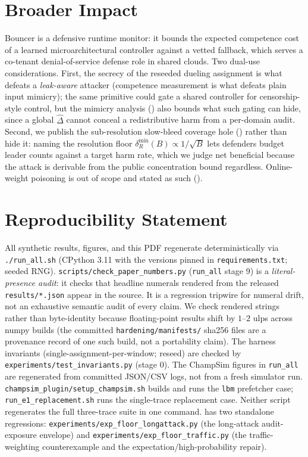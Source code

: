 \documentclass{article}
\newcommand{\dhat}{\hat{\Delta}}
\begin{document}
\section*{Broader Impact}
Bouncer is a defensive runtime monitor: it bounds the expected competence cost of a learned
microarchitectural controller against a vetted fallback, which serves a co-tenant denial-of-service
defense role in shared clouds. Two dual-use considerations. First, the secrecy of the reseeded
dueling assignment is what defeats a \emph{leak-aware} attacker (competence measurement is what defeats plain input mimicry); the same primitive could gate a shared
controller for censorship-style control, but the mimicry analysis () also
bounds what such gating can hide, since a global $\dhat$ cannot conceal a redistributive harm
from a per-domain audit. Second, we publish the sub-resolution slow-bleed coverage hole
() rather than hide it: naming the resolution floor
$\delta_R^{\min}(B)\propto 1/\sqrt{B}$ lets defenders budget leader counts against a target harm
rate, which we judge net beneficial because the attack is derivable from the public
concentration bound regardless. Online-weight poisoning is out of scope and stated as such
().

\section*{Reproducibility Statement}
All synthetic results, figures, and this PDF regenerate deterministically via
\texttt{./run\_all.sh} (CPython 3.11 with the versions pinned in \texttt{requirements.txt};
seeded RNG). \texttt{scripts/check\_paper\_numbers.py} (\texttt{run\_all} stage 9) is a
\emph{literal-presence audit}: it checks that headline numerals rendered from the released
\texttt{results/*.json} appear in the source. It is a regression tripwire for numeral drift, not
an exhaustive semantic audit of every claim. We check rendered strings rather than byte-identity
because floating-point results shift by $1$--$2$ ulps across numpy builds (the committed \texttt{hardening/manifests/} sha256 files are a
provenance record of one such build, not a portability claim). The harness invariants
(single-assignment-per-window; reseed) are checked by \texttt{experiments/test\_invariants.py}
(stage 0). The ChampSim figures in \texttt{run\_all} are regenerated from
committed JSON/CSV logs, not from a fresh simulator run.
\texttt{champsim\_plugin/setup\_champsim.sh} builds and runs the \texttt{lbm}
prefetcher case; \texttt{run\_e1\_replacement.sh} runs the single-trace
replacement case. Neither script regenerates the full three-trace suite in one
command.  has
two standalone regressions: \texttt{experiments/exp\_floor\_longattack.py} (the long-attack
audit-exposure envelope) and \texttt{experiments/exp\_floor\_traffic.py} (the traffic-weighting
counterexample and the expectation/high-probability repair).
\end{document}
